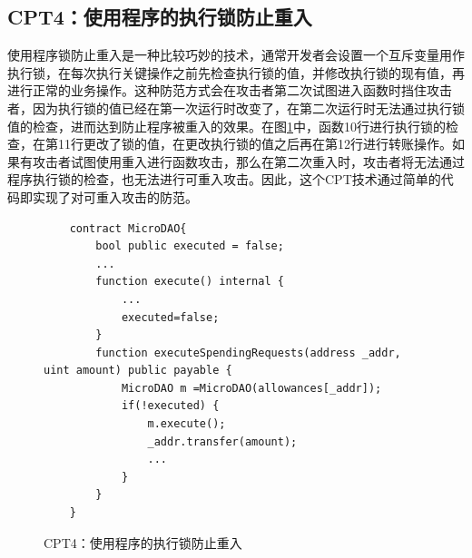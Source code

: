 \subsection{CPT4：使用程序的执行锁防止重入}
使用程序锁防止重入是一种比较巧妙的技术，通常开发者会设置一个互斥变量用作执行锁，在每次执行关键操作之前先检查执行锁的值，并修改执行锁的现有值，再进行正常的业务操作。这种防范方式会在攻击者第二次试图进入函数时挡住攻击者，因为执行锁的值已经在第一次运行时改变了，在第二次运行时无法通过执行锁值的检查，进而达到防止程序被重入的效果。在图\ref{fig:ss4_example}中，函数10行进行执行锁的检查，在第11行更改了锁的值，在更改执行锁的值之后再在第12行进行转账操作。如果有攻击者试图使用重入进行函数攻击，那么在第二次重入时，攻击者将无法通过程序执行锁的检查，也无法进行可重入攻击。因此，这个CPT技术通过简单的代码即实现了对可重入攻击的防范。
\begin{figure}
\begin{minipage}[htbp]{1.0\linewidth}
    \begin{lstlisting}
    contract MicroDAO{
        bool public executed = false;
        ...
        function execute() internal {
            ...
            executed=false;		
        }
        function executeSpendingRequests(address _addr, uint amount) public payable {
            MicroDAO m =MicroDAO(allowances[_addr]);
            if(!executed) {
                m.execute();
                _addr.transfer(amount);
                ...
            }
        }
    }
    \end{lstlisting}
\end{minipage}
\vspace{-5mm}
\caption{CPT4：使用程序的执行锁防止重入}
\label{fig:ss4_example}
\end{figure}

